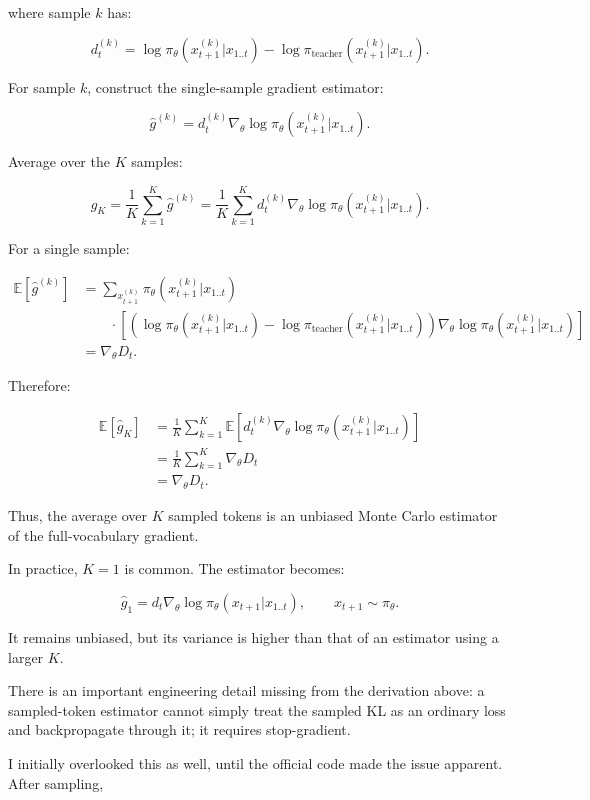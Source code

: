 \documentclass[11pt,a4paper]{article}
\begin{document}
where sample $k$ has:

\[
d_t^{(k)}
=
\log\pi_\theta(x_{t+1}^{(k)}|x_{1..t})
-
\log\pi_{\text{teacher}}(x_{t+1}^{(k)}|x_{1..t}).
\]

For sample $k$, construct the single-sample gradient estimator:

\[
\hat g^{(k)}
=
d_t^{(k)}
\nabla_\theta
\log\pi_\theta(x_{t+1}^{(k)}|x_{1..t}).
\]

Average over the $K$ samples:

\[
\boxed{
\hat g_K
=
\frac1K
\sum_{k=1}^{K}
\hat g^{(k)}
=
\frac1K
\sum_{k=1}^{K}
d_t^{(k)}
\nabla_\theta
\log\pi_\theta(x_{t+1}^{(k)}|x_{1..t}).
}
\]

For a single sample:

\[
\begin{aligned}
\mathbb E[\hat g^{(k)}]
&=
\sum_{x_{t+1}^{(k)}}
\pi_\theta(x_{t+1}^{(k)}|x_{1..t})\\
&\qquad\cdot
\left[
\left(
\log\pi_\theta(x_{t+1}^{(k)}|x_{1..t})
-
\log\pi_{\text{teacher}}(x_{t+1}^{(k)}|x_{1..t})
\right)
\nabla_\theta
\log\pi_\theta(x_{t+1}^{(k)}|x_{1..t})
\right]\\
&=\nabla_\theta D_t.
\end{aligned}
\]

Therefore:

\[
\begin{aligned}
\mathbb E[\hat g_K]
&=
\frac1K\sum_{k=1}^{K}
\mathbb E
\left[
d_t^{(k)}
\nabla_\theta\log\pi_\theta(x_{t+1}^{(k)}|x_{1..t})
\right]\\
&=\frac1K\sum_{k=1}^{K}\nabla_\theta D_t\\
&=\nabla_\theta D_t.
\end{aligned}
\]

Thus, the average over $K$ sampled tokens is an unbiased Monte Carlo estimator of the full-vocabulary gradient.

In practice, $K=1$ is common. The estimator becomes:

\[
\boxed{
\hat g_1
=
d_t\nabla_\theta\log\pi_\theta(x_{t+1}|x_{1..t}),
\qquad
x_{t+1}\sim\pi_\theta.
}
\]

It remains unbiased, but its variance is higher than that of an estimator using a larger $K$.

There is an important engineering detail missing from the derivation above: a sampled-token estimator cannot simply treat the sampled KL as an ordinary loss and backpropagate through it; it requires stop-gradient.

I initially overlooked this as well, until the official code made the issue apparent. After sampling,
\end{document}
